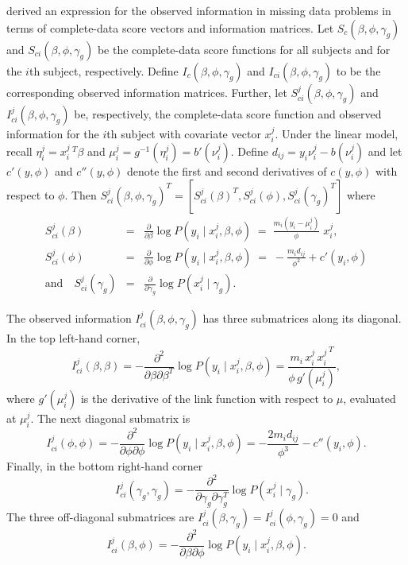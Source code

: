 \documentclass[article, shortnames]{jss}
\begin{document}
\citet{Louis82} derived an expression for the observed information
in missing data problems in terms of complete-data score vectors and 
information matrices.
Let $S_c(\beta,\phi,\gamma_g)$ and $S_{ci}(\beta,\phi, \gamma_g)$
be the complete-data score functions for all subjects
and for the $i$th subject, respectively.
Define $I_c(\beta, \phi, \gamma_g)$ and $I_{ci}(\beta, \phi, \gamma_g)$
to be the corresponding observed information matrices.
Further, let $S^j_{ci}(\beta,\phi,\gamma_g)$
and $I^j_{ci}(\beta, \phi, \gamma_g)$
be, respectively, the complete-data
score function and observed information
for the $i$th subject with covariate vector $x^j_i$.
Under the linear model,
recall $\eta^j_i = x^j_i \, ^T \beta$ and $\mu^j_i=g^{-1}(\eta^j_i)=
b'(\nu^j_i)$. Define $d_{ij}= y_i \nu_i^j - b(\nu_i^j)$ and
let $c'(y,\phi)$ and $c''(y,\phi)$ denote
the first and second derivatives of $c(y, \phi)$ with respect to $\phi$.
Then $S^j_{ci}(\beta,\phi,\gamma_g)^T =
   \left[ S^j_{ci}(\beta)^T,S^j_{ci}(\phi),S^j_{ci}(\gamma_g)^T\right]$
where
\begin{eqnarray*}
S^j_{ci}(\beta) & = &
      \frac{\partial}{\partial \beta} \log P(y_i \mid x^j_i, \beta,\phi)
\; = \; \frac{m_i(y_i - \mu^j_i)}{\phi} \; x^j_i, \\
S^j_{ci}(\phi) & = &
      \frac{\partial}{\partial \phi} \log P(y_i \mid x^j_i, \beta,\phi)
\; = \; -\frac{m_i d_{ij}}{\phi^2} + c'(y_i,\phi) \\
\mbox{and} \quad S^j_{ci}(\gamma_g) &= &
      \frac{\partial}{\partial \gamma_g} \log P(x^j_i \mid \gamma_g).
\end{eqnarray*}

The observed information
$I^j_{ci}(\beta, \phi, \gamma_g)$
has three submatrices along its diagonal.
In the top left-hand corner,
$$
     I^j_{ci}(\beta,\beta)  =
     - \frac{\partial^2}{\partial \beta \partial \beta^T}
               \log P(y_i \mid x^j_i, \beta,\phi) =
\frac {m_i \, x^j_i \, {x^j_i}^{\,T}} {\phi \, g'( \mu^j_i)},
$$
where
$g'(\mu^j_i)$ is the derivative of the link function
with respect to $\mu$,
evaluated at $\mu^j_i$.
The next diagonal submatrix is
$$
     I^j_{ci}(\phi,\phi)=
     -\frac{\partial^2}{\partial \phi \partial \phi}
               \log P(y_i \mid x^j_i, \beta,\phi) =
-\frac{2 m_i d_{ij}}{\phi^3} - c''(y_i,\phi).$$
Finally, in the bottom right-hand corner
$$
\quad I^j_{ci}(\gamma_g,\gamma_g)=
     -\frac{\partial^2}{\partial \gamma_g \partial \gamma_g^T}
               \log P(x^j_i \mid \gamma_g).
$$
The three off-diagonal submatrices
are $I^j_{ci}(\beta,\gamma_g) = I^j_{ci}(\phi,\gamma_g) = 0$
and
$$
     I^j_{ci}(\beta,\phi)  =
     -\frac{\partial^2}{\partial \beta \partial \phi}
               \log P(y_i \mid x^j_i, \beta,\phi).
$$
\end{document}
